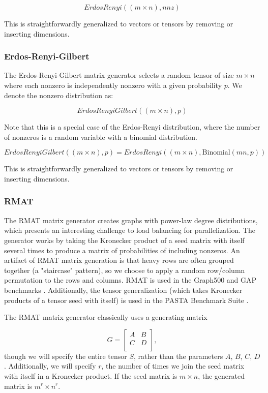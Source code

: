 \documentclass{article}
\begin{document}
	\[
		ErdosRenyi((m \times n), nnz)
	\]

	This is straightforwardly generalized to vectors or tensors by removing or inserting dimensions.

\subsubsection{Erdos-Renyi-Gilbert}
	The Erdos-Renyi-Gilbert matrix generator selects a random tensor of size $m \times n$ where each nonzero is independently nonzero with a given probability $p$. We denote the nonzero distribution as:


	\[
		ErdosRenyiGilbert((m \times n), p)
	\]

	Note that this is a special case of the Erdos-Renyi distribution, where the number of nonzeros is a random variable with a binomial distribution.

	\[
		ErdosRenyiGilbert((m \times n), p) = ErdosRenyi((m \times n), \text{Binomial}(mn, p))
	\]

	This is straightforwardly generalized to vectors or tensors by removing or inserting dimensions.

\subsubsection{RMAT}
    The RMAT matrix generator \cite{chakrabarti_r-mat_2004} creates graphs with
    power-law degree distributions, which presents an interesting challenge to
    load balancing for parallelization. The generator works by taking the
    Kronecker product of a seed matrix with itself several times to produce a
    matrix of probabilities of including nonzeros. An artifact of RMAT matrix
    generation is that heavy rows are often grouped together (a "staircase"
    pattern), so we choose to apply a random row/column permutation to the rows
    and columns. RMAT is used in the Graph500 and GAP benchmarks
    \cite{noauthor_graph_nodate, beamer_gap_2017}. Additionally, the tensor
    generalization (which takes Kronecker products of a tensor seed with itself)
    is used in the PASTA Benchmark Suite \cite{li_pasta_2019}.

    The RMAT matrix generator classically uses a generating matrix

	\[
		G = \left[\begin{array}{cc}
			A & B \\
			C & D \\
		\end{array}\right],
	\]
	though we will specify the entire tensor $S$, rather than the parameters
	$A$, $B$, $C$, $D$. Additionally, we will specify $r$, the number of times we join the seed matrix with itself in a Kronecker product. If the seed matrix is $m \times n$, the generated matrix is $m^r \times n^r$.
\end{document}

